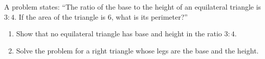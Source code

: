 A problem states: ``The ratio of the base to the height of an equilateral triangle is $3:4$. If the area of the triangle is $6$, what is its perimeter?''
\begin{enumerate}
\item[(a)] Show that no equilateral triangle has base and height in the ratio $3:4$.
\item[(b)] Solve the problem for a right triangle whose legs are the base and the height.
\end{enumerate}
